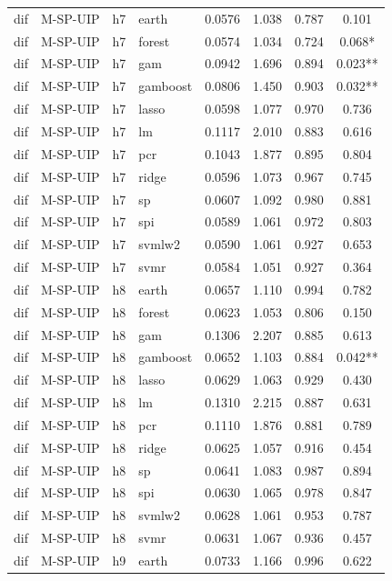 \begin{ThreePartTable}
\begin{longtable}[t]{llclcccc}
\addlinespace
dif & M-SP-UIP & h7 & earth & 0.0576 & 1.038 & 0.787 & 0.101\\
dif & M-SP-UIP & h7 & forest & 0.0574 & 1.034 & 0.724 & 0.068*\\
dif & M-SP-UIP & h7 & gam & 0.0942 & 1.696 & 0.894 & 0.023**\\
dif & M-SP-UIP & h7 & gamboost & 0.0806 & 1.450 & 0.903 & 0.032**\\
dif & M-SP-UIP & h7 & lasso & 0.0598 & 1.077 & 0.970 & 0.736\\
dif & M-SP-UIP & h7 & lm & 0.1117 & 2.010 & 0.883 & 0.616\\
dif & M-SP-UIP & h7 & pcr & 0.1043 & 1.877 & 0.895 & 0.804\\
dif & M-SP-UIP & h7 & ridge & 0.0596 & 1.073 & 0.967 & 0.745\\
dif & M-SP-UIP & h7 & sp & 0.0607 & 1.092 & 0.980 & 0.881\\
dif & M-SP-UIP & h7 & spi & 0.0589 & 1.061 & 0.972 & 0.803\\
dif & M-SP-UIP & h7 & svmlw2 & 0.0590 & 1.061 & 0.927 & 0.653\\
dif & M-SP-UIP & h7 & svmr & 0.0584 & 1.051 & 0.927 & 0.364\\
\addlinespace
dif & M-SP-UIP & h8 & earth & 0.0657 & 1.110 & 0.994 & 0.782\\
dif & M-SP-UIP & h8 & forest & 0.0623 & 1.053 & 0.806 & 0.150\\
dif & M-SP-UIP & h8 & gam & 0.1306 & 2.207 & 0.885 & 0.613\\
dif & M-SP-UIP & h8 & gamboost & 0.0652 & 1.103 & 0.884 & 0.042**\\
dif & M-SP-UIP & h8 & lasso & 0.0629 & 1.063 & 0.929 & 0.430\\
dif & M-SP-UIP & h8 & lm & 0.1310 & 2.215 & 0.887 & 0.631\\
dif & M-SP-UIP & h8 & pcr & 0.1110 & 1.876 & 0.881 & 0.789\\
dif & M-SP-UIP & h8 & ridge & 0.0625 & 1.057 & 0.916 & 0.454\\
dif & M-SP-UIP & h8 & sp & 0.0641 & 1.083 & 0.987 & 0.894\\
dif & M-SP-UIP & h8 & spi & 0.0630 & 1.065 & 0.978 & 0.847\\
dif & M-SP-UIP & h8 & svmlw2 & 0.0628 & 1.061 & 0.953 & 0.787\\
dif & M-SP-UIP & h8 & svmr & 0.0631 & 1.067 & 0.936 & 0.457\\
\addlinespace
dif & M-SP-UIP & h9 & earth & 0.0733 & 1.166 & 0.996 & 0.622\\

\end{longtable}
\end{ThreePartTable}
